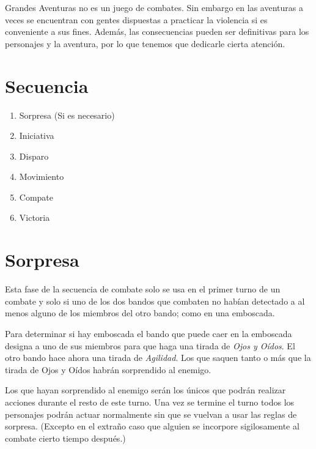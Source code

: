 
Grandes Aventuras no es un juego de combates. Sin embargo en las
aventuras a veces se encuentran con gentes dispuestas a practicar
la violencia si es conveniente a sus fines. Además, las consecuencias
pueden ser definitivas para los personajes y la aventura, por lo que
tenemos que dedicarle cierta atención.

\section{Secuencia}

\begin{enumerate}
\item Sorpresa (Si es necesario)
\item Iniciativa
\item Disparo
\item Movimiento
\item Compate
\item Victoria
\end{enumerate}

\section{Sorpresa}

Esta fase de la secuencia de combate solo se usa en el primer turno de un
combate y solo si uno de los dos bandos que combaten no habían detectado
a al menos alguno de los miembros del otro bando; como en una emboscada.

Para determinar si hay emboscada el bando que puede caer en la emboscada 
designa a uno de sus miembros para que haga una tirada de \emph{Ojos y Oídos}.
El otro bando hace ahora una tirada de \emph{Agilidad}. Los que saquen tanto
o más que la tirada de Ojos y Oídos habrán sorprendido al enemigo.

Los que hayan sorprendido al enemigo serán los únicos que podrán realizar acciones
durante el resto de este turno. Una vez se termine el turno todos los personajes
podrán actuar normalmente sin que se vuelvan a usar las reglas de sorpresa. (Excepto
en el extraño caso que alguien se incorpore sigilosamente al combate cierto tiempo
después.)


